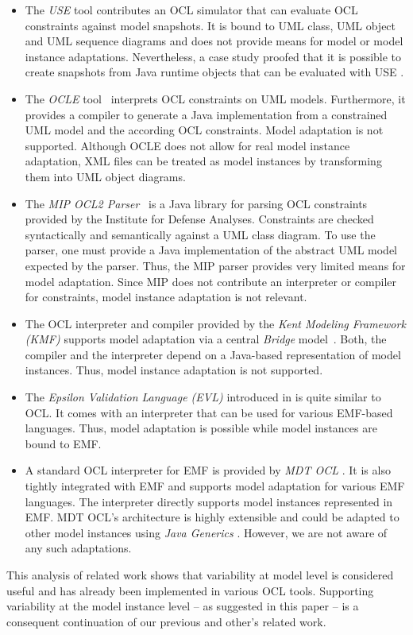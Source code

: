 \begin{itemize}
  
\item The \emph{USE} tool \cite{gogolla2007use} contributes an OCL simulator that can
evaluate OCL constraints against model snapshots. It is bound to UML class, UML object and
UML sequence diagrams and does not provide means for model or model instance
adaptations. Nevertheless, a case study proofed that it is possible to create snapshots
from Java runtime objects that can be evaluated with USE \cite{occello:ICSTW08}.

\item The \emph{OCLE} tool~\cite{WWW:OCLE} interprets OCL constraints on
UML models. Furthermore, it provides a compiler to generate a Java
implementation from a constrained UML model and the according OCL 
constraints. Model adaptation is not supported. Although OCLE does not allow for
real model instance adaptation, XML files can be treated as model instances by
transforming them into UML object diagrams.

\item The \emph{MIP OCL2 Parser}~\cite{WWW:MIP} is a Java library for parsing OCL
constraints provided by the Institute for Defense Analyses. Constraints are
checked syntactically and semantically against a UML class diagram.
To use the parser, one must provide a Java implementation of the abstract 
UML model expected by the parser. Thus,
the MIP parser provides very limited means for model adaptation. Since MIP does
not contribute an interpreter or compiler for constraints, model
instance adaptation is not relevant.

\item The OCL interpreter and compiler provided by the \emph{Kent Modeling Framework
(KMF)} supports model adaptation via a central \emph{Bridge}
model~\cite{akehurst2003ocl}. Both, the compiler and the interpreter depend on a
Java-based representation of model instances. Thus, model instance adaptation is not
supported.

\item The \emph{Epsilon Validation Language (EVL)} introduced in
\cite{kolovos2008detecting} is quite similar to OCL. It comes with an
interpreter that can be used for various EMF-based languages. Thus, model
adaptation is possible while model instances are bound to EMF.
 
\item A standard OCL interpreter for EMF is provided by \emph{MDT OCL}
\cite{WWW:MDT}. It is also tightly integrated with EMF and supports 
model adaptation for various EMF languages. The interpreter directly supports
model instances represented in EMF. MDT OCL's architecture is highly extensible
and could be adapted to other model instances using \emph{Java Generics} \cite{damus:EclipseCon08}. 
However, we are not aware of any such adaptations.

\end{itemize}

This analysis of related work shows that variability at  model level is
considered useful and has already been implemented in various OCL tools.
Supporting variability at the model instance level -- as suggested in this paper -- 
is a consequent continuation of our previous and other's related work.